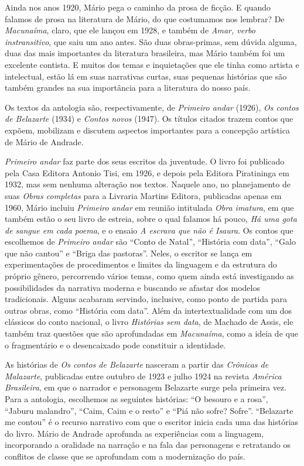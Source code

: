 \documentclass[12pt]{extarticle}
\begin{document}
Ainda nos anos 1920, Mário pega o caminho da prosa de ficção. E quando
falamos de prosa na literatura de Mário, do que costumamos nos lembrar?
De \emph{Macunaíma}, claro, que ele lançou em 1928, e também de
\emph{Amar, verbo instransitivo}, que saiu um ano antes. São duas
obras-primas, sem dúvida alguma, duas das mais importantes da literatura
brasileira, mas Mário também foi um excelente contista. E muitos dos
temas e inquietações que ele tinha como artista e intelectual, estão lá
em suas narrativas curtas, suas pequenas histórias que são também
grandes na sua importância para a literatura do nosso país.

Os textos da antologia são, respectivamente, de \emph{Primeiro andar}
(1926), \emph{Os contos de Belazarte} (1934) e \emph{Contos novos}
(1947). Os títulos citados trazem contos que expõem, mobilizam e
discutem aspectos importantes para a concepção artística de Mário de
Andrade.

\emph{Primeiro andar} faz parte dos seus escritos da juventude. O livro
foi publicado pela Casa Editora Antonio Tisi, em 1926, e depois pela
Editora Piratininga em 1932, mas sem nenhuma alteração nos textos.
Naquele ano, no planejamento de suas \emph{Obras completas} para a
Livraria Martins Editora, publicadas apenas em 1960, Mário incluiu
\emph{Primeiro andar} em reunião intitulada \emph{Obra imatura}, em que
também estão o seu livro de estreia, sobre o qual falamos há pouco,
\emph{Há uma gota de sangue em cada poema}, e o ensaio \emph{A escrava
que não é Isaura}. Os contos que escolhemos de \emph{Primeiro andar} são
``Conto de Natal'', ``História com data'', ``Galo que não cantou'' e
``Briga das pastoras''. Neles, o escritor se lança em experimentações de
procedimentos e limites da linguagem e da estrutura do próprio gênero,
percorrendo vários temas, como quem ainda está investigando as
possibilidades da narrativa moderna e buscando se afastar dos modelos
tradicionais. Alguns acabaram servindo, inclusive, como ponto de partida
para outras obras, como ``História com data''. Além da intertextualidade
com um dos clássicos do conto nacional, o livro \emph{Histórias sem
data}, de Machado de Assis, ele também traz questões que são
aprofundadas em \emph{Macunaíma}, como a ideia de que o fragmentário e o
desencaixado pode constituir a identidade.

As histórias de \emph{Os contos de Belazarte} nasceram a partir das
\emph{Crônicas de Malazarte}, publicadas entre outubro de 1923 e julho
1924 na revista \emph{América Brasileira}, em que o narrador e
personagem Belazarte surge pela primeira vez. Para a antologia,
escolhemos as seguintes histórias: ``O besouro e a rosa'', ``Jaburu
malandro'', ``Caim, Caim e o resto'' e ``Piá não sofre? Sofre''.
``Belazarte me contou'' é o recurso narrativo com que o escritor inicia
cada uma das histórias do livro. Mário de Andrade aprofunda as
experiências com a linguagem, incorporando a oralidade na narração e na
fala das personagens e retratando os conflitos de classe que se
aprofundam com a modernização do país.
\end{document}
